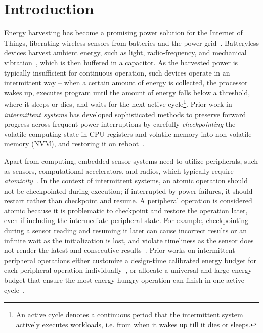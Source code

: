 \section{Introduction}


Energy harvesting has become a promising power solution for the Internet of Things, liberating wireless sensors from batteries and the power grid~\cite{sliper2020energy-driven}. 
Batteryless devices harvest ambient energy, such as light, radio-frequency, and mechanical vibration~\cite{sravanthi2008survey, shaikh2016energy}, which is then buffered in a capacitor. 
As the harvested power is typically insufficient for continuous operation, such devices operate in an intermittent way -- when a certain amount of energy is collected, the processor wakes up, executes program until the amount of energy falls below a threshold, where it sleeps or dies, and waits for the next active cycle\footnote{An active cycle denotes a continuous period that the intermittent system actively executes workloads, i.e. from when it wakes up till it dies or sleeps. }. 
Prior work in \textit{intermittent systems} has developed sophisticated methods to preserve forward progress across frequent power interruptions by carefully \textit{checkpointing} the volatile computing state in CPU registers and volatile memory into non-volatile memory (NVM), and restoring it on reboot~\cite{umesh2021survey}. 



Apart from computing, embedded sensor systems need to utilize peripherals, such as sensors, computational accelerators, and radios, which typically require \textit{atomicity}~\cite{berthou2020formal}.
In the context of intermittent systems, an atomic operation should not be checkpointed during execution; if interrupted by power failures, it should restart rather than checkpoint and resume.
A peripheral operation is considered atomic because it is problematic to checkpoint and restore the operation later, even if including the intermediate peripheral state.
For example, checkpointing during a sensor reading and resuming it later can cause incorrect results or an infinite wait as the initialization is lost, and violate timeliness as the sensor does not render the latest and consecutive results~\cite{maeng2019supporting}. 
Prior works on intermittent peripheral operations either customize a design-time calibrated energy budget for each peripheral operation individually~\cite{gomez2016dynamic}, or allocate a universal and large energy budget that ensure the most energy-hungry operation can finish in one active cycle~\cite{maeng2019supporting}.




